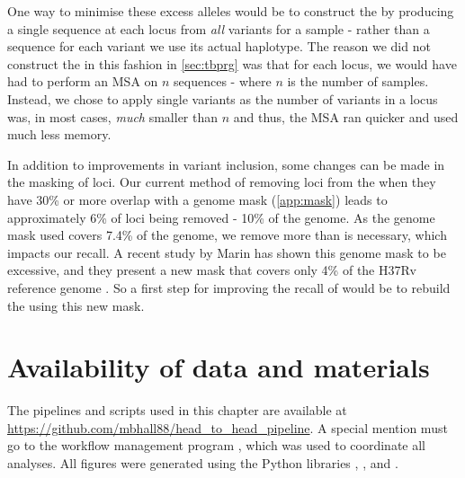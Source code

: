 One way to minimise these excess alleles would be to construct the \panrg{} by producing a single sequence at each locus from \emph{all} variants for a sample - rather than a sequence for each variant we use its actual haplotype. The reason we did not construct the \panrg{} in this fashion in \autoref{sec:tbprg} was that for each locus, we would have had to perform an MSA on $n$ sequences - where $n$ is the number of samples. Instead, we chose to apply single variants as the number of variants in a locus was, in most cases, \emph{much} smaller than $n$ and thus, the MSA ran quicker and used much less memory.

In addition to improvements in variant inclusion, some changes can be made in the masking of loci. Our current method of removing loci from the \panrg{} when they have 30\% or more overlap with a genome mask (\autoref{app:mask}) leads to approximately 6\% of loci being removed - 10\% of the genome. As the genome mask used covers 7.4\% of the genome, we remove more than is necessary, which impacts our recall. A recent study by Marin \etal{} has shown this genome mask to be excessive, and they present a new mask that covers only 4\% of the H37Rv reference genome \cite{marin2021}. So a first step for improving the recall of \pandora{} would be to rebuild the \panrg{} using this new mask.


\section{Availability of data and materials}

The pipelines and scripts used in this chapter are available at \url{https://github.com/mbhall88/head_to_head_pipeline}. A special mention must go to the workflow management program  \cite{snakemake2021}, which was used to coordinate all analyses. All figures were generated using the Python libraries  \cite{matplotlib},  \cite{seaborn}, and  \cite{bokeh}.